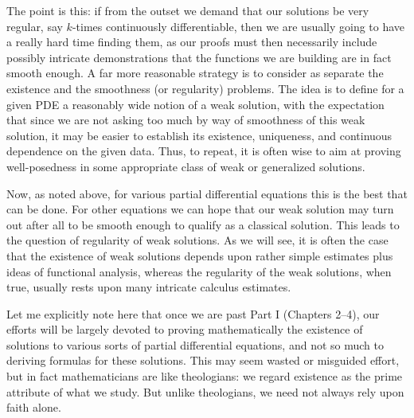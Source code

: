 The point is this: if from the outset we demand that our solutions be very regular, say $k$-times continuously differentiable, then we are usually going to have a really hard time finding them, as our proofs must then necessarily include possibly intricate demonstrations that the functions we are building are in fact smooth enough. A far more reasonable strategy is to consider as separate the existence and the smoothness (or regularity) problems. The idea is to define for a given PDE a reasonably wide notion of a weak solution, with the expectation that since we are not asking too much by way of smoothness of this weak solution, it may be easier to establish its existence, uniqueness, and continuous dependence on the given data. Thus, to repeat, it is often wise to aim at proving well-posedness in some appropriate class of weak or generalized solutions. \par\Needspace{65mm}

Now, as noted above, for various partial differential equations this is the best that can be done. For other equations we can hope that our weak solution may turn out after all to be smooth enough to qualify as a classical solution. This leads to the question of regularity of weak solutions. As we will see, it is often the case that the existence of weak solutions depends upon rather simple estimates plus ideas of functional analysis, whereas the regularity of the weak solutions, when true, usually rests upon many intricate calculus estimates.

Let me explicitly note here that once we are past Part I (Chapters 2--4), our efforts will be largely devoted to proving mathematically the existence of solutions to various sorts of partial differential equations, and not so much to deriving formulas for these solutions. This may seem wasted or misguided effort, but in fact mathematicians are like theologians: we regard existence as the prime attribute of what we study. But unlike theologians, we need not always rely upon faith alone.

